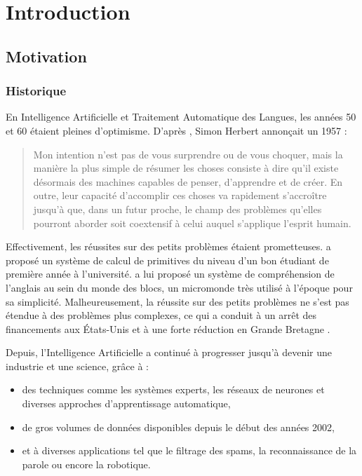 \chapter{Introduction}
\label{ch:intro}

\section{Motivation}

\subsection{Historique}

En Intelligence Artificielle et Traitement Automatique des Langues, les années
50 et 60 étaient pleines d'optimisme. D'après \citep{russell2010artificial},
Simon Herbert annonçait un 1957 :

\begin{quote}
    Mon intention n'est pas de vous surprendre ou de vous choquer, mais la
    manière la plus simple de résumer les choses consiste à dire qu'il existe
    désormais des machines capables de penser, d'apprendre et de créer. En
    outre, leur capacité d'accomplir ces choses va rapidement s'accroître
    jusqu'à que, dans un futur proche, le champ des problèmes qu'elles pourront
    aborder soit coextensif à celui auquel s'applique l'esprit humain.
\end{quote}

Effectivement, les réussites sur des petits problèmes étaient prometteuses.
\cite{slagle1963heuristic} a proposé un système de calcul de primitives du
niveau d'un bon étudiant de première année à l'université.
\cite{winograd1971procedures} a lui proposé un système de compréhension de
l'anglais au sein du monde des blocs, un micromonde très utilisé à l'époque
pour sa simplicité. Malheureusement, la réussite sur des petits problèmes ne
s'est pas étendue à des problèmes plus complexes, ce qui a conduit à un arrêt
des financements aux États-Unis \citep{pierce1966alpac} et à une forte
réduction en Grande Bretagne \citep{lighthill1973artificial}.

Depuis, l'Intelligence Artificielle a continué à progresser jusqu'à devenir une
industrie et une science, grâce à :
\begin{itemize}
    \item des techniques comme les systèmes experts, les réseaux de neurones et
        diverses approches d'apprentissage automatique,
    \item de gros volumes de données disponibles depuis le début des années
        2002,
    \item et à diverses applications tel que le filtrage des spams, la
        reconnaissance de la parole ou encore la robotique.
\end{itemize}

